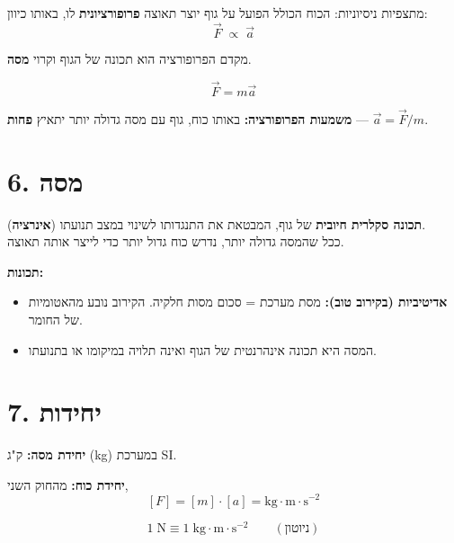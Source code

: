 \documentclass[12pt, a4paper]{article}
\newcommand{\hvec}[1]{\overrightarrow{#1}}
\begin{document}
מתצפיות ניסיוניות: הכוח הכולל הפועל על גוף יוצר תאוצה \textbf{פרופורציונית} לו, באותו כיוון:
\[
  \hvec{F} \;\propto\; \hvec{a}
\]

מקדם הפרופורציה הוא תכונה של הגוף וקרוי \textbf{מסה}.

\begin{tcolorbox}[resultbox, title={החוק השני}]
\[
  \hvec{F} = m\hvec{a}
\]
\end{tcolorbox}

\textbf{משמעות הפרופורציה:} באותו כוח, גוף עם מסה גדולה יותר יתאיץ \textbf{פחות} --- \textenglish{$\hvec{a} = \hvec{F}/m$}.

\section*{6. מסה}

\begin{tcolorbox}[defbox, title={מסה}]
\textbf{תכונה סקלרית חיובית} של גוף, המבטאת את התנגדותו לשינוי במצב תנועתו (\textbf{אינרציה}).\\[3pt]
ככל שהמסה גדולה יותר, נדרש כוח גדול יותר כדי לייצר אותה תאוצה.
\end{tcolorbox}

\textbf{תכונות:}
\begin{itemize}
  \item \textbf{אדיטיביות (בקירוב טוב):} מסת מערכת = סכום מסות חלקיה. הקירוב נובע מהאטומיות של החומר.
  \item המסה היא תכונה אינהרנטית של הגוף ואינה תלויה במיקומו או בתנועתו.
\end{itemize}

\section*{7. יחידות}

\textbf{יחידת מסה:} ק"ג (\textenglish{kg}) במערכת \textenglish{SI}.

\textbf{יחידת כוח:} מהחוק השני,
\[
  [F] = [m]\cdot[a] = \text{kg}\cdot\text{m}\cdot\text{s}^{-2}
\]

\begin{tcolorbox}[resultbox]
\[
  1\;\text{N} \equiv 1\;\text{kg}\cdot\text{m}\cdot\text{s}^{-2}
  \qquad (\text{ניוטון})
\]
\end{tcolorbox}
\end{document}
